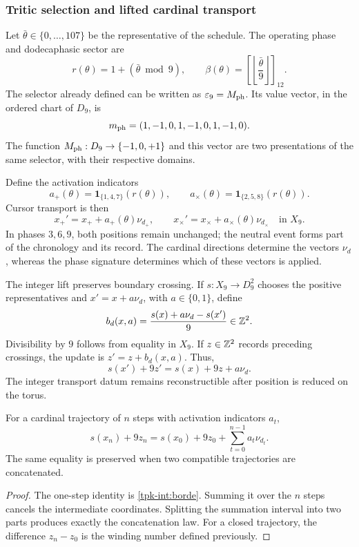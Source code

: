 \subsubsection{Tritic selection and lifted cardinal transport}
\label{tpk-int:seleccion}

Let \(\bar\theta\in\{0,\ldots,107\}\) be the representative of the schedule.
The operating phase and dodecaphasic sector are
\begin{equation}
 r(\theta)=1+(\bar\theta\bmod9),\qquad
 \beta(\theta)=\left[\left\lfloor\frac{\bar\theta}{9}\right\rfloor\right]_{12}.
 \label{tpk-int:fase}
\end{equation}
The selector already defined can be written as \(\varepsilon_9=M_{\rm ph}\).
Its value vector, in the ordered chart of \(D_9\), is
\[
 m_{\rm ph}=(1,-1,0,1,-1,0,1,-1,0).
\]
The function \(M_{\rm ph}:D_9\to\{-1,0,+1\}\) and this vector are two
presentations of the same selector, with their respective domains.

Define the activation indicators
\[
 a_+(\theta)=\mathbf1_{\{1,4,7\}}(r(\theta)),\qquad
 a_\times(\theta)=\mathbf1_{\{2,5,8\}}(r(\theta)).
\]
Cursor transport is then
\begin{equation}
 x_+'=x_++a_+(\theta)\nu_{d_+},\qquad
 x_\times'=x_\times+a_\times(\theta)\nu_{d_\times}
 \quad\text{in }X_9.
 \label{tpk-int:cursores}
\end{equation}
In phases \(3,6,9\), both positions remain unchanged; the neutral event
forms part of the chronology and its record. The cardinal directions
determine the vectors \(\nu_d\), whereas the phase signature determines
which of these vectors is applied.

The integer lift preserves boundary crossing. If
\(s:X_9\to D_9^2\) chooses the positive representatives and
\(x'=x+a\nu_d\), with \(a\in\{0,1\}\), define
\begin{equation}
 b_d(x,a)=\frac{s(x)+a\nu_d-s(x')}{9}\in\mathbb Z^2.
 \label{tpk-int:borde}
\end{equation}
Divisibility by \(9\) follows from equality in \(X_9\).
If \(z\in\mathbb Z^2\) records preceding crossings, the update is
\(z'=z+b_d(x,a)\). Thus,
\[
 s(x')+9z'=s(x)+9z+a\nu_d.
\]
The integer transport datum remains reconstructible after position is
reduced on the torus.

\begin{proposition}
\label{tpk-int:prop-desplazamiento}
For a cardinal trajectory of \(n\) steps with activation indicators
\(a_t\),
\[
 s(x_n)+9z_n=s(x_0)+9z_0+
 \sum_{t=0}^{n-1}a_t\nu_{d_t}.
\]
The same equality is preserved when two compatible trajectories are concatenated.
\end{proposition}
\begin{proof}
The one-step identity is \eqref{tpk-int:borde}. Summing it over the
\(n\) steps cancels the intermediate coordinates. Splitting the summation
interval into two parts produces exactly the concatenation law. For a
closed trajectory, the difference \(z_n-z_0\) is the winding number
defined previously.
\end{proof}

